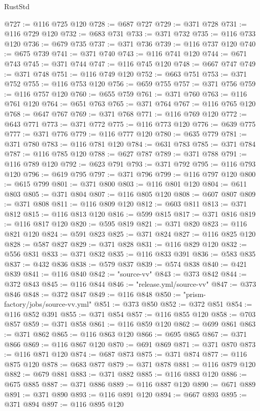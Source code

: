 \begin{lexlean}{RustStd}
\begin{coremodule}
@727 := @116 @725 @120
@728 := @687 @727
@729 := @371 @728
@731 := @116 @729 @120
@732 := @683 @731
@733 := @371 @732
@735 := @116 @733 @120
@736 := @679 @735
@737 := @371 @736
@739 := @116 @737 @120
@740 := @675 @739
@741 := @371 @740
@743 := @116 @741 @120
@744 := @671 @743
@745 := @371 @744
@747 := @116 @745 @120
@748 := @667 @747
@749 := @371 @748
@751 := @116 @749 @120
@752 := @663 @751
@753 := @371 @752
@755 := @116 @753 @120
@756 := @659 @755
@757 := @371 @756
@759 := @116 @757 @120
@760 := @655 @759
@761 := @371 @760
@763 := @116 @761 @120
@764 := @651 @763
@765 := @371 @764
@767 := @116 @765 @120
@768 := @647 @767
@769 := @371 @768
@771 := @116 @769 @120
@772 := @643 @771
@773 := @371 @772
@775 := @116 @773 @120
@776 := @639 @775
@777 := @371 @776
@779 := @116 @777 @120
@780 := @635 @779
@781 := @371 @780
@783 := @116 @781 @120
@784 := @631 @783
@785 := @371 @784
@787 := @116 @785 @120
@788 := @627 @787
@789 := @371 @788
@791 := @116 @789 @120
@792 := @623 @791
@793 := @371 @792
@795 := @116 @793 @120
@796 := @619 @795
@797 := @371 @796
@799 := @116 @797 @120
@800 := @615 @799
@801 := @371 @800
@803 := @116 @801 @120
@804 := @611 @803
@805 := @371 @804
@807 := @116 @805 @120
@808 := @607 @807
@809 := @371 @808
@811 := @116 @809 @120
@812 := @603 @811
@813 := @371 @812
@815 := @116 @813 @120
@816 := @599 @815
@817 := @371 @816
@819 := @116 @817 @120
@820 := @595 @819
@821 := @371 @820
@823 := @116 @821 @120
@824 := @591 @823
@825 := @371 @824
@827 := @116 @825 @120
@828 := @587 @827
@829 := @371 @828
@831 := @116 @829 @120
@832 := @556 @831
@833 := @371 @832
@835 := @116 @833 @391
@836 := @583 @835
@837 := @432 @836
@838 := @579 @837
@839 := @574 @838
@840 := @421 @839
@841 := @116 @840
@842 := "source-vv"
@843 := @373 @842
@844 := @372 @843
@845 := @116 @844
@846 := "release.yml/source-vv"
@847 := @373 @846
@848 := @372 @847
@849 := @116 @848
@850 := "prism-factory/jobs/source-vv.yml"
@851 := @373 @850
@852 := @372 @851
@854 := @116 @852 @391
@855 := @371 @854
@857 := @116 @855 @120
@858 := @703 @857
@859 := @371 @858
@861 := @116 @859 @120
@862 := @699 @861
@863 := @371 @862
@865 := @116 @863 @120
@866 := @695 @865
@867 := @371 @866
@869 := @116 @867 @120
@870 := @691 @869
@871 := @371 @870
@873 := @116 @871 @120
@874 := @687 @873
@875 := @371 @874
@877 := @116 @875 @120
@878 := @683 @877
@879 := @371 @878
@881 := @116 @879 @120
@882 := @679 @881
@883 := @371 @882
@885 := @116 @883 @120
@886 := @675 @885
@887 := @371 @886
@889 := @116 @887 @120
@890 := @671 @889
@891 := @371 @890
@893 := @116 @891 @120
@894 := @667 @893
@895 := @371 @894
@897 := @116 @895 @120

\end{coremodule}
\end{lexlean}
